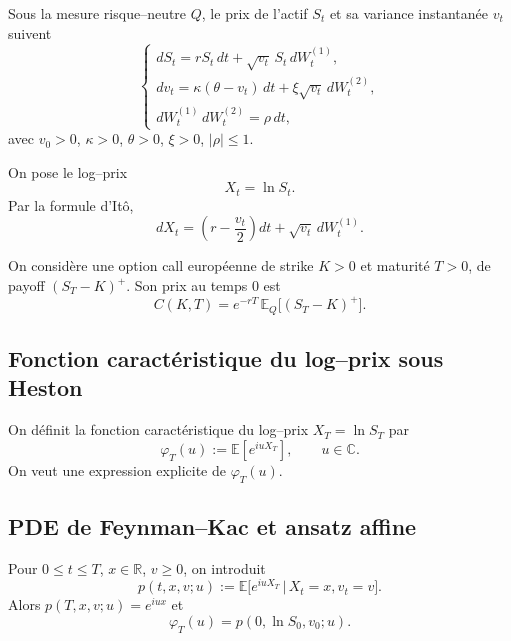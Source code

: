 \documentclass[11pt,a4paper]{article}
\newcommand{\1}{\mathbf{1}}
\begin{document}
Sous la mesure risque--neutre $Q$, le prix de l'actif $S_t$ et sa variance
instantan\'ee $v_t$ suivent
\begin{equation}
\begin{cases}
dS_t = r S_t\,dt + \sqrt{v_t}\,S_t\,dW^{(1)}_t, \\[3pt]
dv_t = \kappa(\theta - v_t)\,dt + \xi\sqrt{v_t}\,dW^{(2)}_t, \\[3pt]
dW^{(1)}_t\,dW^{(2)}_t = \rho\,dt,
\end{cases}
\end{equation}
avec $v_0 > 0$, $\kappa>0$, $\theta>0$, $\xi>0$, $|\rho|\le 1$.

On pose le log--prix
\begin{equation}
X_t = \ln S_t.
\end{equation}
Par la formule d'It\^o,
\begin{equation}
dX_t = \left(r - \frac{v_t}{2}\right)dt + \sqrt{v_t}\,dW^{(1)}_t.
\end{equation}

On consid\`ere une option call europ\'eenne de strike $K>0$ et maturit\'e $T>0$,
de payoff $(S_T-K)^+$. Son prix au temps $0$ est
\begin{equation}
C(K,T) = e^{-rT}\,\mathbb{E}_Q\big[(S_T - K)^+\big].
\end{equation}

\subsection{Fonction caract\'eristique du log--prix sous Heston}

On d\'efinit la fonction caract\'eristique du log--prix $X_T = \ln S_T$ par
\begin{equation}
\varphi_T(u) := \mathbb{E}\!\left[ e^{i u X_T} \right], \qquad u\in\mathbb{C}.
\end{equation}
On veut une expression explicite de $\varphi_T(u)$.

\subsection{PDE de Feynman--Kac et ansatz affine}

Pour $0\le t\le T$, $x\in\mathbb{R}$, $v\ge0$, on introduit
\begin{equation}
p(t,x,v;u) := \mathbb{E}\big[ e^{i u X_T} \,\big|\, X_t=x, v_t=v \big].
\end{equation}
Alors $p(T,x,v;u) = e^{iux}$ et
\begin{equation}
\varphi_T(u) = p(0,\ln S_0, v_0;u).
\end{equation}
\end{document}
